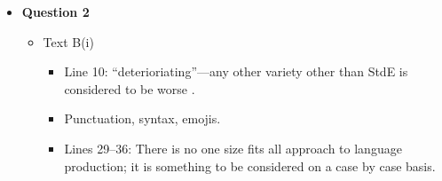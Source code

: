 \documentclass[../main.tex]{subfiles}
\begin{document}
\begin{itemize}
\begin{itemize}
					\end{itemize}
				\item \textbf{Question 2} \begin{itemize}
					\item Text B(i) \begin{itemize}
							\item Line 10: ``deterioriating''---any other variety other than StdE is considered to be worse .
							\item Punctuation, syntax, emojis.
							\item Lines 29--36: There is no one size fits all approach to language production; it is something to be considered on a case by case basis.
						\end{itemize}
					\end{itemize}
				\end{itemize}
\end{document}
